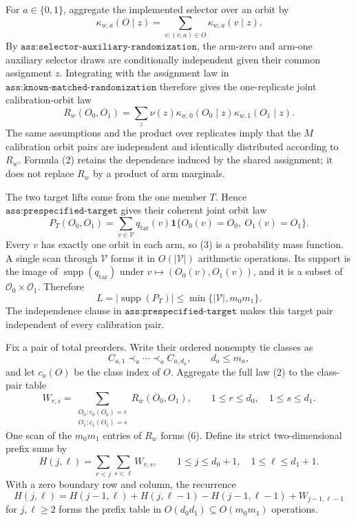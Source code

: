 For \(a\in\{0,1\}\), aggregate the implemented selector over an orbit by
\[
\kappa_{w,a}(O\mid z)=\sum_{v:(v,a)\in O}\kappa_{w,a}(v\mid z).
\tag{1}
\]
By \(\texttt{ass:selector-auxiliary-randomization}\), the arm-zero and arm-one auxiliary selector draws are conditionally independent given their common assignment \(z\). Integrating with the assignment law in \(\texttt{ass:known-matched-randomization}\) therefore gives the one-replicate joint calibration-orbit law
\[
R_w(O_0,O_1)=\sum_z\nu(z)\kappa_{w,0}(O_0\mid z)\kappa_{w,1}(O_1\mid z).
\tag{2}
\]
The same assumptions and the product over replicates imply that the \(M\) calibration orbit pairs are independent and identically distributed according to \(R_w\). Formula (2) retains the dependence induced by the shared assignment; it does not replace \(R_w\) by a product of arm marginals.

The two target lifts come from the one member \(T\). Hence \(\texttt{ass:prespecified-target}\) gives their coherent joint orbit law
\[
P_T(O_0,O_1)=\sum_{v\in\mathcal V}q_{\mathrm{tar}}(v)
\mathbf 1\{O_0(v)=O_0,\ O_1(v)=O_1\}.
\tag{3}
\]
Every \(v\) has exactly one orbit in each arm, so (3) is a probability mass function. A single scan through \(\mathcal V\) forms it in \(O(|\mathcal V|)\) arithmetic operations. Its support is the image of \(\operatorname{supp}(q_{\mathrm{tar}})\) under \(v\mapsto(O_0(v),O_1(v))\), and it is a subset of \(\mathcal O_0\times\mathcal O_1\). Therefore
\[
L=|\operatorname{supp}(P_T)|\le\min\{|\mathcal V|,m_0m_1\}.
\tag{4}
\]
The independence clause in \(\texttt{ass:prespecified-target}\) makes this target pair independent of every calibration pair.

Fix a pair of total preorders. Write their ordered nonempty tie classes as
\[
C_{a,1}\prec_a\cdots\prec_a C_{a,d_a},\qquad d_a\le m_a,
\tag{5}
\]
and let \(c_a(O)\) be the class index of \(O\). Aggregate the full law (2) to the class-pair table
\[
W_{r,s}=
\sum_{\substack{O_0:c_0(O_0)=r\\O_1:c_1(O_1)=s}}
R_w(O_0,O_1),
\qquad 1\le r\le d_0,\quad 1\le s\le d_1.
\tag{6}
\]
One scan of the \(m_0m_1\) entries of \(R_w\) forms (6). Define its strict two-dimensional prefix sums by
\[
H(j,\ell)=\sum_{r<j}\sum_{s<\ell}W_{r,s},
\qquad
1\le j\le d_0+1,\quad 1\le\ell\le d_1+1.
\tag{7}
\]
With a zero boundary row and column, the recurrence
\[
H(j,\ell)=H(j-1,\ell)+H(j,\ell-1)-H(j-1,\ell-1)+W_{j-1,\ell-1}
\tag{8}
\]
for \(j,\ell\ge2\) forms the prefix table in \(O(d_0d_1)\subseteq O(m_0m_1)\) operations.

